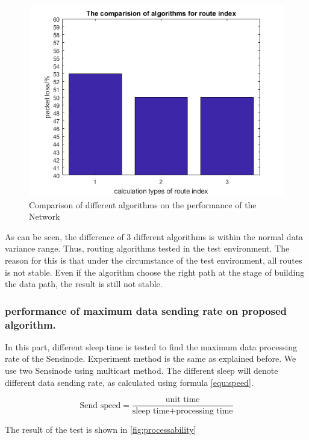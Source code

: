 \begin{figure}
    \centering
    \includegraphics{Figures/algorithm.png}
    \caption{Comparison of different algorithms on the performance of the Network}
    \label{fig:algorithm_comp}
\end{figure}

As can be seen, the difference of 3 different algorithms is within the normal data variance range. Thus, routing algorithms tested in the test environment.
The reason for this is that under the circumstance of the test environment, all routes is not stable. Even if the algorithm choose the right path at the stage of building the data path, the result is still not stable.

\subsubsection{performance of maximum data sending rate on proposed algorithm.}

In this part, different sleep time is tested to find the maximum data processing rate of the Sensinode. Experiment method is the same as explained before. We use two Sensinode using multicast method. The different sleep will denote different data sending rate, as calculated using formula \ref{equ:speed}. 

\begin{equation}
    \text{Send speed} = 
     \frac{\text{unit time}}{\text{sleep time} + \text{processing time}}
\label{equ:speed}
\end{equation}

The result of the test is shown in \ref{fig:processability}

